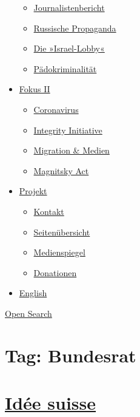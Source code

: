 \begin{itemize}
  \begin{itemize}
  \tightlist
  \item
    \href{https://swprs.org/bericht-eines-journalisten/}{Journalistenbericht}
  \item
    \href{https://swprs.org/russische-propaganda/}{Russische Propaganda}
  \item
    \href{https://swprs.org/die-israel-lobby-fakten-und-mythen/}{Die
    »Israel-Lobby«}
  \item
    \href{https://swprs.org/geopolitik-und-paedokriminalitaet/}{Pädokriminalität}
  \end{itemize}
\item
  \href{https://swprs.org/migration-und-medien/}{Fokus II}

  \begin{itemize}
  \tightlist
  \item
    \href{https://swprs.org/covid-19-hinweis-ii/}{Coronavirus}
  \item
    \href{https://swprs.org/die-integrity-initiative/}{Integrity
    Initiative}
  \item
    \href{https://swprs.org/migration-und-medien/}{Migration \& Medien}
  \item
    \href{https://swprs.org/der-fall-magnitsky/}{Magnitsky Act}
  \end{itemize}
\item
  \href{https://swprs.org/kontakt/}{Projekt}

  \begin{itemize}
  \tightlist
  \item
    \href{https://swprs.org/kontakt/}{Kontakt}
  \item
    \href{https://swprs.org/uebersicht/}{Seitenübersicht}
  \item
    \href{https://swprs.org/medienspiegel/}{Medienspiegel}
  \item
    \href{https://swprs.org/donationen/}{Donationen}
  \end{itemize}
\item
  \href{https://swprs.org/contact/}{English}
\end{itemize}

\protect\hyperlink{}{Open Search}

\hypertarget{tag-bundesrat}{%
\section{Tag: Bundesrat}\label{tag-bundesrat}}

\hypertarget{iduxe9e-suisse}{%
\section{\texorpdfstring{\href{https://swprs.org/2017/03/01/srg-idee-suisse/}{Idée
suisse}}{Idée suisse}}\label{iduxe9e-suisse}}

